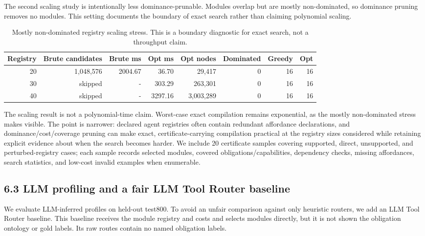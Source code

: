 \documentclass[
  10pt,
]{article}
\begin{document}
The second scaling study is intentionally less dominance-prunable.
Modules overlap but are mostly non-dominated, so dominance pruning
removes no modules. This setting documents the boundary of exact search
rather than claiming polynomial scaling.

\begin{table}[H]
\centering
\scriptsize
\caption{Mostly non-dominated registry scaling stress. This is a boundary diagnostic for exact search, not a throughput claim.}
\label{tab:scaling-hard}
\begin{tabular}{rrrrrrrr}
\toprule
Registry & Brute candidates & Brute ms & Opt ms & Opt nodes & Dominated & Greedy & Opt\\
\midrule
20 & 1,048,576 & 2004.67 & 36.70 & 29,417 & 0 & 16 & 16\\
30 & skipped & - & 303.29 & 263,301 & 0 & 16 & 16\\
40 & skipped & - & 3297.16 & 3,003,289 & 0 & 16 & 16\\
\bottomrule
\end{tabular}
\end{table}

The scaling result is not a polynomial-time claim. Worst-case exact
compilation remains exponential, as the mostly non-dominated stress
makes visible. The point is narrower: declared agent registries often
contain redundant affordance declarations, and dominance/cost/coverage
pruning can make exact, certificate-carrying compilation practical at
the registry sizes considered while retaining explicit evidence about
when the search becomes harder. We include 20 certificate samples
covering supported, direct, unsupported, and perturbed-registry cases;
each sample records selected modules, covered obligations/capabilities,
dependency checks, missing affordances, search statistics, and low-cost
invalid examples when enumerable.

\subsection{6.3 LLM profiling and a fair LLM Tool Router
baseline}\label{llm-profiling-and-a-fair-llm-tool-router-baseline}

We evaluate LLM-inferred profiles on held-out test800. To avoid an
unfair comparison against only heuristic routers, we add an LLM Tool
Router baseline. This baseline receives the module registry and costs
and selects modules directly, but it is not shown the obligation
ontology or gold labels. Its raw routes contain no named obligation
labels.
\end{document}
